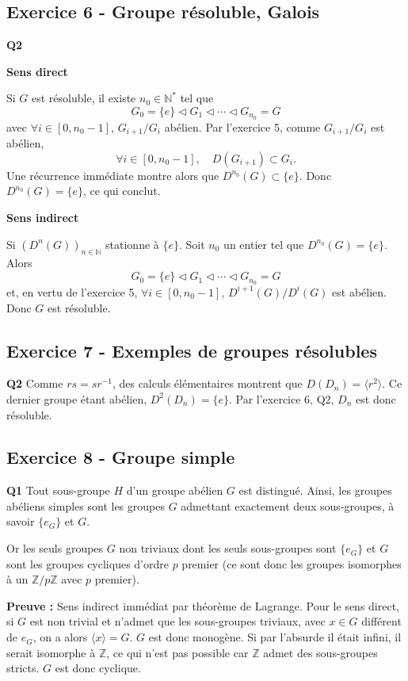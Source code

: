 \documentclass[11pt,a4paper]{article}
\newcommand{\normal}{\mathrel{\triangleleft}}
\begin{document}
\subsection*{Exercice 6 - Groupe résoluble, Galois}
\textbf{Q2}

\textbf{Sens direct}

Si $G$ est résoluble, il existe $n_0\in\mathbb N^*$ tel que
\[
G_0=\{e\}\normal G_1\normal\cdots\normal G_{n_0}=G
\]
avec $\forall i\in[0,n_0-1]$, $G_{i+1}/G_i$ abélien. Par l'exercice 5, comme $G_{i+1}/G_i$ est abélien,
\[
\forall i\in[0,n_0-1],\quad D(G_{i+1})\subset G_i.
\]
Une récurrence immédiate montre alors que $D^{n_0}(G)\subset\{e\}$. Donc $D^{n_0}(G)=\{e\}$, ce qui conclut.

\textbf{Sens indirect}

Si $(D^n(G))_{n\in\mathbb N}$ stationne à $\{e\}$. Soit $n_0$ un entier tel que $D^{n_0}(G)=\{e\}$. Alors
\[
G_0=\{e\}\normal G_1\normal\cdots\normal G_{n_0}=G
\]
et, en vertu de l'exercice 5, $\forall i\in[0,n_0-1]$, $D^{i+1}(G)/D^i(G)$ est abélien. Donc $G$ est résoluble.

\subsection*{Exercice 7 - Exemples de groupes résolubles}
\textbf{Q2} Comme $rs=sr^{-1}$, des calculs élémentaires montrent que $D(D_n)=\langle r^2\rangle$. Ce dernier groupe étant abélien, $D^2(D_n)=\{e\}$. Par l'exercice 6, Q2, $D_n$ est donc résoluble.

\subsection*{Exercice 8 - Groupe simple}
\textbf{Q1} Tout sous-groupe $H$ d'un groupe abélien $G$ est distingué. Ainsi, les groupes abéliens simples sont les groupes $G$ admettant exactement deux sous-groupes, à savoir $\{e_G\}$ et $G$.

Or les seuls groupes $G$ non triviaux dont les seuls sous-groupes sont $\{e_G\}$ et $G$ sont les groupes cycliques d'ordre $p$ premier (ce sont donc les groupes isomorphes à un $\mathbb Z/p\mathbb Z$ avec $p$ premier).

\textbf{Preuve :} Sens indirect immédiat par théorème de Lagrange. Pour le sens direct, si $G$ est non trivial et n'admet que les sous-groupes triviaux, avec $x\in G$ différent de $e_G$, on a alors $\langle x\rangle=G$. $G$ est donc monogène. Si par l'absurde il était infini, il serait isomorphe à $\mathbb Z$, ce qui n'est pas possible car $\mathbb Z$ admet des sous-groupes stricts. $G$ est donc cyclique.
\end{document}
